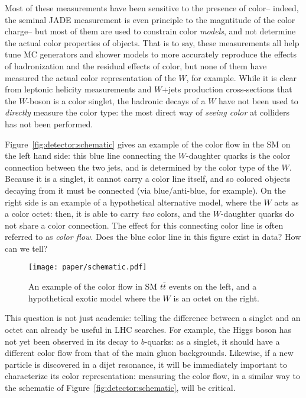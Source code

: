 Most of these measurements have been sensitive to the presence of color-- indeed, the seminal JADE measurement is even principle to the magntitude of the color charge-- but most of them are used to constrain color \textit{models}, and not determine the actual color properties of objects. That is to say, these measurements all help tune MC generators and shower models to more accurately reproduce the effects of hadronization and the residual effects of color, but none of them have measured the actual color representation of the $W$, for example. While it is clear from leptonic helicity measurements and $W$+jets production cross-sections that the $W$-boson is a color singlet, the hadronic decays of a $W$ have not been used to \textit{directly} measure the color type: the most direct way of \textit{seeing color} at colliders has not been performed.

Figure~\ref{fig:detector:schematic} gives an example of the color flow in the SM on the left hand side: this blue line connecting the $W$-daughter quarks is the color connection between the two jets, and is determined by the color type of the $W$. Because it is a singlet, it cannot carry a color line itself, and so colored objects decaying from it must be connected (via blue/anti-blue, for example). On the right side is an example of a hypothetical alternative model, where the $W$ acts as a color octet: then, it is able to carry \textit{two} colors, and the $W$-daughter quarks do not share a color connection. The effect for this connecting color line is often referred to as \textit{color flow}. Does the blue color line in this figure exist in data? How can we tell?


\begin{figure}
\centering
\texttt{[image: paper/schematic.pdf]}
\label{fig:color:motivation:schematic}
\caption{An example of the color flow in SM $t\bar{t}$ events on the left, and a hypothetical exotic model where the $W$ is an octet on the right.}
\end{figure}


This question is not just academic: telling the difference between a singlet and an octet can already be useful in LHC searches. For example, the Higgs boson has not yet been observed in its decay to $b$-quarks: as a singlet, it should have a different color flow from that of the main gluon backgrounds. Likewise, if a new particle is discovered in a dijet resonance, it will be immediately important to characterize its color representation: measuring the color flow, in a similar way to the schematic of Figure~\ref{fig:detector:schematic}, will be critical. 


